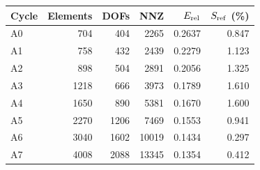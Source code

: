 \begin{tabular}{@{}lrrrrr@{}}
\toprule
Cycle & Elements & DOFs & NNZ & $E_{\rm rel}$ & $S_{\rm ref}$ (\%)\\
\midrule
A0 & 704 & 404 & 2265 & 0.2637 & 0.847\\
A1 & 758 & 432 & 2439 & 0.2279 & 1.123\\
A2 & 898 & 504 & 2891 & 0.2056 & 1.325\\
A3 & 1218 & 666 & 3973 & 0.1789 & 1.610\\
A4 & 1650 & 890 & 5381 & 0.1670 & 1.600\\
A5 & 2270 & 1206 & 7469 & 0.1553 & 0.941\\
A6 & 3040 & 1602 & 10019 & 0.1434 & 0.297\\
A7 & 4008 & 2088 & 13345 & 0.1354 & 0.412\\
\bottomrule
\end{tabular}
